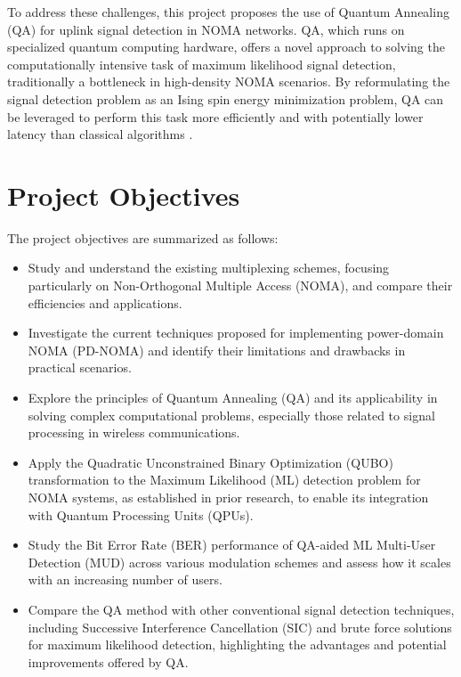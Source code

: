 To address these challenges, this project proposes the use of Quantum Annealing (QA) for uplink signal detection in NOMA networks. QA, which runs on specialized quantum computing hardware, offers a novel approach to solving the computationally intensive task of maximum likelihood signal detection, traditionally a bottleneck in high-density NOMA scenarios. By reformulating the signal detection problem as an Ising spin energy minimization problem, QA can be leveraged to perform this task more efficiently and with potentially lower latency than classical algorithms \cite{Gabdulsattarov2023,Kizilirmak2020}.





\section{ Project Objectives}\label{objectives}
The project objectives are summarized as follows:
\begin{itemize}
    \item Study and understand the existing multiplexing schemes, focusing particularly on Non-Orthogonal Multiple Access (NOMA), and compare their efficiencies and applications.
    
    \item Investigate the current techniques proposed for implementing power-domain NOMA (PD-NOMA) and identify their limitations and drawbacks in practical scenarios.
    
    \item Explore the principles of Quantum Annealing (QA) and its applicability in solving complex computational problems, especially those related to signal processing in wireless communications.
    
    \item Apply the Quadratic Unconstrained Binary Optimization (QUBO) transformation to the Maximum Likelihood (ML) detection problem for NOMA systems, as established in prior research, to enable its integration with Quantum Processing Units (QPUs).
    
    \item Study the Bit Error Rate (BER) performance of QA-aided ML Multi-User Detection (MUD) across various modulation schemes and assess how it scales with an increasing number of users.
    
    \item Compare the QA method with other conventional signal detection techniques, including Successive Interference Cancellation (SIC) and brute force solutions for maximum likelihood detection, highlighting the advantages and potential improvements offered by QA.
\end{itemize}


